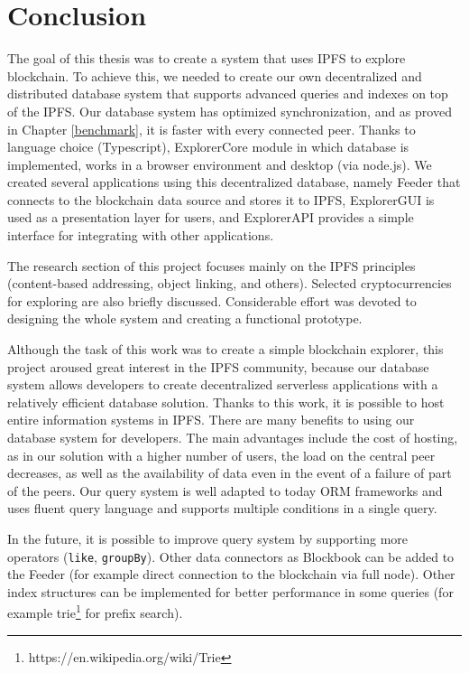 \chapter{Conclusion}
\label{Conclusion}
The goal of this thesis was to create a system that uses IPFS to explore blockchain. To achieve this, we needed to create our own decentralized and distributed database system that supports advanced queries and indexes on top of the IPFS. Our database system has optimized synchronization, and as proved in Chapter \ref{benchmark}, it is faster with every connected peer. Thanks to language choice (Typescript), ExplorerCore module in which database is implemented, works in a browser environment and desktop (via node.js). We created several applications using this decentralized database, namely Feeder that connects to the blockchain data source and stores it to IPFS, ExplorerGUI is used as a presentation layer for users, and ExplorerAPI provides a simple interface for integrating with other applications.

The research section of this project focuses mainly on the IPFS principles (content-based addressing, object linking, and others). Selected cryptocurrencies for exploring are also briefly discussed. Considerable effort was devoted to designing the whole system and creating a functional prototype.

Although the task of this work was to create a simple blockchain explorer, this project aroused great interest in the IPFS community, because our database system allows developers to create decentralized serverless applications with a relatively efficient database solution. Thanks to this work, it is possible to host entire information systems in IPFS. There are many benefits to using our database system for developers. The main advantages include the cost of hosting, as in our solution with a higher number of users, the load on the central peer decreases, as well as the availability of data even in the event of a failure of part of the peers. Our query system is well adapted to today ORM frameworks and uses fluent query language and supports multiple conditions in a single query. 

In the future, it is possible to improve query system by supporting more operators (\texttt{like}, \texttt{groupBy}). Other data connectors as Blockbook can be added to the Feeder (for example direct connection to the blockchain via full node). Other index structures can be implemented for better performance in some queries (for example trie\footnote{https://en.wikipedia.org/wiki/Trie} for prefix search).



